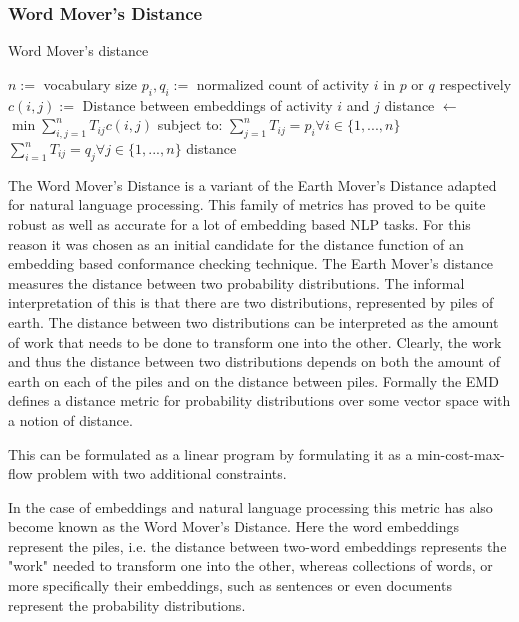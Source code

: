 \documentclass[runningheads]{template/llncs}
\begin{document}
\subsubsection{Word Mover's Distance}

\color{blue}
\begin{algorithm}
	\caption{Word Mover's distance}\label{alg:wmd}
	\begin{algorithmic}
		\State $n:=$ vocabulary size
		\State $p_i,q_i := $ normalized count of activity $i$ in $p$ or $q$ respectively
		\State $c(i,j) :=$ Distance between embeddings of activity $i$ and $j$
		\State distance $\gets$ $\min \sum_{i,j=1}^n T_{ij}c(i,j)$
		\State subject to:
		\State $\sum_{j=1}^{n}T_{ij}=p_i \forall i \in \{1,...,n\}$ 
		\State $\sum_{i=1}^{n}T_{ij}=q_j \forall j \in \{1,...,n\}$ 
		\State \Return distance
		\EndFunction
	\end{algorithmic}
\end{algorithm}
The Word Mover's Distance \cite{KSKW15} is a variant of the Earth Mover's Distance \cite{RTGu98} adapted for natural language processing.
This family of metrics has proved to be quite robust as well as accurate for a lot of embedding based NLP tasks.
For this reason it was chosen as an initial candidate for the distance function of an embedding based conformance checking technique.
The Earth Mover's distance measures the distance between two probability distributions.
The informal interpretation of this is that there are two distributions, represented by piles of earth.
The distance between two distributions can be interpreted as the amount of work that needs to be done to transform one into the other.
Clearly, the work and thus the distance between two distributions depends on both the amount of earth on each of the piles and on the distance between piles.
Formally the EMD defines a distance metric for probability distributions over some vector space with a notion of distance.

This can be formulated as a linear program by formulating it as a min-cost-max-flow problem with two additional constraints. 

In the case of embeddings and natural language processing this metric has also become known as the Word Mover's Distance.
Here the word embeddings represent the piles, i.e. the distance between two-word embeddings represents the "work" needed to transform one into the other, whereas collections of words, or more specifically their embeddings, such as sentences or even documents represent the probability distributions.
\end{document}
